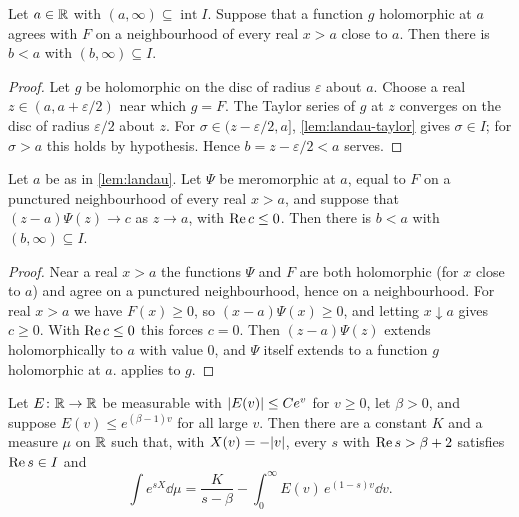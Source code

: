 \begin{lemma}[Landau]\label{lem:landau}
Let $a\in\mathbb{R}$ with $(a,\infty)\subseteq\operatorname{int}I$. Suppose that a function $g$ holomorphic
at $a$ agrees with $F$ on a neighbourhood of every real $x>a$ close to $a$. Then there is $b<a$ with
$(b,\infty)\subseteq I$.
\end{lemma}

\begin{proof}
Let $g$ be holomorphic on the disc of radius $\varepsilon$ about $a$. Choose a real
$z\in(a,a+\varepsilon/2)$ near which $g=F$. The Taylor series of $g$ at $z$ converges on the disc of
radius $\varepsilon/2$ about $z$. For $\sigma\in(z-\varepsilon/2,a]$, \cref{lem:landau-taylor} gives
$\sigma\in I$; for $\sigma>a$ this holds by hypothesis. Hence $b=z-\varepsilon/2<a$ serves.
\end{proof}

\begin{lemma}\label{lem:landau-pole}
Let $a$ be as in \cref{lem:landau}. Let $\Psi$ be meromorphic at $a$, equal to $F$ on a punctured
neighbourhood of every real $x>a$, and suppose that $(z-a)\Psi(z)\to c$ as $z\to a$, with
$\operatorname{Re} c\le0$. Then there is $b<a$ with $(b,\infty)\subseteq I$.
\end{lemma}

\begin{proof}
Near a real $x>a$ the functions $\Psi$ and $F$ are both holomorphic (for $x$ close to $a$) and agree
on a punctured neighbourhood, hence on a neighbourhood. For real $x>a$ we have $F(x)\ge0$, so
$(x-a)\Psi(x)\ge0$, and letting $x\downarrow a$ gives $c\ge0$. With $\operatorname{Re} c\le0$ this forces $c=0$.
Then $(z-a)\Psi(z)$ extends holomorphically to $a$ with value $0$, and $\Psi$ itself extends to a
function $g$ holomorphic at $a$.  applies to $g$.
\end{proof}

\begin{lemma}\label{lem:density}
Let $E\colon\mathbb{R}\to\mathbb{R}$ be measurable with $\lvert E(v)\rvert\le Ce^v$ for $v\ge0$, let $\beta>0$, and suppose
$E(v)\le e^{(\beta-1)v}$ for all large $v$. Then there are a constant $K$ and a measure $\mu$ on
$\mathbb{R}$ such that, with $X(v)=-\lvert v\rvert$, every $s$ with $\operatorname{Re} s>\beta+2$ satisfies $\operatorname{Re} s\in I$ and
\[
  \int e^{sX}\dd\mu=\frac{K}{s-\beta}-\int_0^\infty E(v)\,e^{(1-s)v}\dd v.
\]
\end{lemma}

